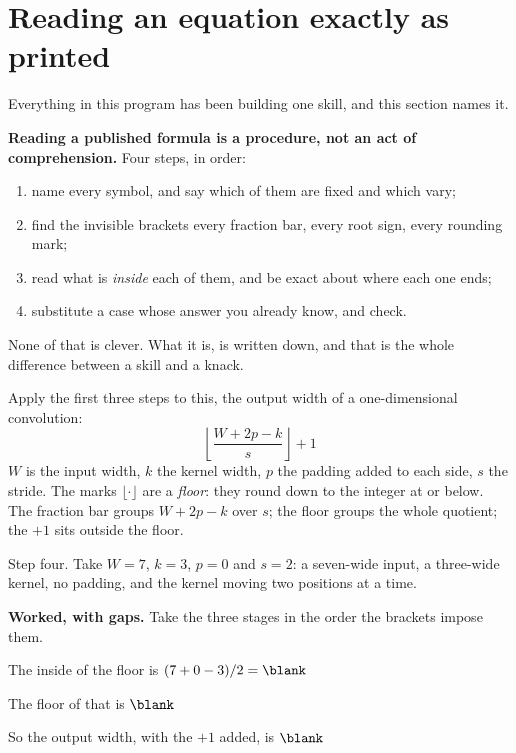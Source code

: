 \section{Reading an equation exactly as printed}
\label{sec:F02-reading}

\begin{fr}
Everything in this program has been building one skill, and this section names
it.

\textbf{Reading a published formula is a procedure, not an act of
comprehension.} Four steps, in order:

\begin{enumerate}
\item name every symbol, and say which of them are fixed and which vary;
\item find the invisible brackets \dash{} every fraction bar, every root sign,
  every rounding mark;
\item read what is \emph{inside} each of them, and be exact about where each
  one ends;
\item substitute a case whose answer you already know, and check.
\end{enumerate}

None of that is clever. What it is, is written down, and that is the whole
difference between a skill and a knack.

Apply the first three steps to this, the output width of a one-dimensional
convolution:
\[ \left\lfloor \frac{W + 2p - k}{s} \right\rfloor + 1 \]
$W$ is the input width, $k$ the kernel width, $p$ the padding added to each
side, $s$ the stride. The marks $\lfloor \cdot \rfloor$ are a \emph{floor}:
they round down to the integer at or below. The fraction bar groups
$W + 2p - k$ over $s$; the floor groups the whole quotient; the $+ 1$ sits
outside the floor.
\end{fr}


\begin{fr}
Step four. Take $W = 7$, $k = 3$, $p = 0$ and $s = 2$: a seven-wide input, a
three-wide kernel, no padding, and the kernel moving two positions at a time.

\textbf{Worked, with gaps.} Take the three stages in the order the brackets
impose them.

The inside of the floor is $(7 + 0 - 3)/2 = \blank$

The floor of that is $\blank$

So the output width, with the $+ 1$ added, is $\blank$
\dotline
\nextframe
\end{fr}

